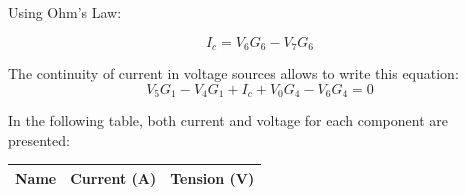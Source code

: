 Using Ohm's Law:

\begin{equation}
    I_{c} = V_{6} G_{6} - V_{7} G_{6}
\end{equation}
\vspace{0.5cm}


The continuity of current in voltage sources allows to write this equation:
\begin{equation} 
    V_{5} G_{1} - V_{4} G_{1} + I_{c} + V_{0} G_{4} - V_{6} G_{4} = 0   
\end{equation}

In the following table, both current and voltage for each component are presented:
\begin{center}
\begin{tabular}{ |c|c|c| }
 \hline
\textbf{Name} & \textbf{Current (A)} & \textbf{Tension (V)} \\
 \hline
 
\end{tabular}
\end{center}

\pagebreak





